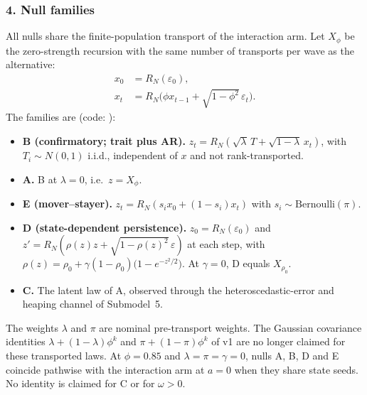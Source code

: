 \subsubsection*{4. Null families}
All nulls share the finite-population transport of the interaction arm. Let $X_\phi$ be the zero-strength recursion with the same number of transports per wave as the alternative:
\begin{align*}
x_0&=R_N(\varepsilon_0),\\
x_t&=R_N\bigl(\phi x_{t-1}+\sqrt{1-\phi^2}\,\varepsilon_t\bigr).
\end{align*}
The families are (code: ):
\begin{itemize}
\item \textbf{B (confirmatory; trait plus AR).} $z_t=R_N(\sqrt\lambda\,T+\sqrt{1-\lambda}\,x_t)$, with $T_i\sim N(0,1)$ i.i.d., independent of $x$ and not rank-transported.
\item \textbf{A.} B at $\lambda=0$, i.e.\ $z=X_\phi$.
\item \textbf{E (mover--stayer).} $z_t=R_N(s_i x_0+(1-s_i)x_t)$ with $s_i\sim\mathrm{Bernoulli}(\pi)$.
\item \textbf{D (state-dependent persistence).} $z_0=R_N(\varepsilon_0)$ and $z'=R_N(\rho(z)z+\sqrt{1-\rho(z)^2}\,\varepsilon)$ at each step, with $\rho(z)=\rho_0+\gamma(1-\rho_0)\bigl(1-e^{-z^2/2}\bigr)$. At $\gamma=0$, D equals $X_{\rho_0}$.
\item \textbf{C.} The latent law of A, observed through the heteroscedastic-error and heaping channel of Submodel~5.
\end{itemize}
The weights $\lambda$ and $\pi$ are nominal pre-transport weights. The Gaussian covariance identities $\lambda+(1-\lambda)\phi^k$ and $\pi+(1-\pi)\phi^k$ of v1 are no longer claimed for these transported laws. At $\phi=0.85$ and $\lambda=\pi=\gamma=0$, nulls A, B, D and E coincide pathwise with the interaction arm at $a=0$ when they share state seeds. No identity is claimed for C or for $\omega>0$.

